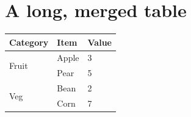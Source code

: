 \documentclass{article}
\begin{document}
\section{A long, merged table}

\begin{longtable}{lll}
\toprule
Category & Item & Value \\
\midrule
\endhead
\multirow{2}{*}{Fruit} & Apple & 3 \\
                       & Pear  & 5 \\
\multirow{2}{*}{Veg}   & Bean  & 2 \\
                       & Corn  & 7 \\
\bottomrule
\end{longtable}
\end{document}
